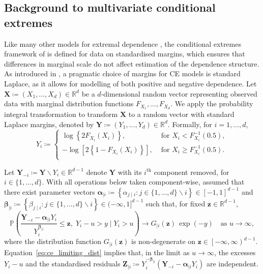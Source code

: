 \documentclass[12pt,compact]{article}
\begin{document}
\subsection{Background to multivariate conditional extremes}
\label{subsec:ce_model}

Like many other models for extremal dependence \citep[see, e.g.,][]{Davison2015}, the conditional extremes framework of \citet{Heffernan2004} is defined for data on standardised margins, which ensures that differences in marginal scale do not affect estimation of the dependence structure.
As introduced in \citet{Keef2013}, a pragmatic choice of margins for CE models is standard Laplace, as it allows for modelling of both positive and negative dependence.
Let $\symbf{X} \coloneqq (X_1, \ldots, X_d) \in \mathbb{R}^d$ be a $d$-dimensional random vector representing observed data with marginal distribution functions $F_{X_1}, \ldots, F_{X_d}$.
We apply the probability integral transformation to transform $\symbf{X}$ to a random vector with standard Laplace margins, denoted by $\symbf{Y} \coloneqq (Y_1, \ldots, Y_d) \in \mathbb{R}^d$.
Formally, for $i = 1, \ldots, d$, 
\begin{equation}\label{eq:laplace}
  Y_i \coloneqq \begin{cases}
    \log\left\{2F_{X_i}(X_i)\right\}, &\text{ for } X_i < F_{X_i}^{-1}(0.5), \\
    -\log\left[2\left\{ 1 - F_{X_i}(X_i)\right\} \right], &\text{ for } X_i \ge F_{X_i}^{-1}(0.5). \\
  \end{cases}
\end{equation}

Let $\symbf{Y}_{-i} \coloneq \symbf{Y} \backslash Y_i \in \mathbb{R}^{d-1}$ denote $\symbf{Y}$ with its $i^{\text{th}}$ component removed, for $i \in \{1, \ldots, d\}$.
With all operations below taken component-wise, \citet{Heffernan2004} assumed that there exist parameter vectors $\symbf{\alpha}_{\mid i} \coloneqq \left\{\alpha_{j \mid i} : j\in\{1,\dots,d\}\backslash i \right\} \in [-1, 1]^{d-1}$ and $\symbf{\beta}_{\mid i} \coloneqq \left\{\beta_{j \mid i} : j\in\{1,\dots,d\}\backslash i \right\} \in (-\infty, 1]^{d-1}$ such that, for fixed $\symbf{z} \in \mathbb{R}^{d-1}$,
\begin{equation}\label{eq:ce_limiting_dist}
  \mathbb{P}\!\left(
  \frac{\symbf{Y}_{-i} - \symbf{\alpha}_{\mid i} Y_{i}}
  {Y_{i}^{\symbf{\beta}_{\mid i}}}
  \le \symbf{z},\; 
  Y_i - u > y \;\Big|\; Y_i > u
  \right)
  \longrightarrow
  G_{\mid i}(\symbf{z})\,\exp{(-y)}
  \quad\text{as } u \to \infty,
\end{equation}
where the distribution function $G_{\mid i}\left(\symbf{z}\right)$ is non-degenerate on $\symbf{z} \in \left[ -\infty, \infty \right)^{d-1}$.
Equation~\eqref{eq:ce_limiting_dist} implies that, in the limit as $u\to\infty$, the excesses $Y_i-u$ and the standardised residuals 
$\symbf{Z}_{\mid i} \coloneqq Y_i^{-\symbf{\beta}_{\mid i}}\left(\symbf{Y}_{-i} - \symbf{\alpha}_{\mid i} Y_{i}\right)$ are independent.
\end{document}
